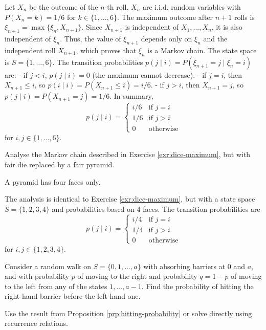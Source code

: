 \begin{Solution}
Let $X_n$ be the outcome of the $n$-th roll. $X_n$ are i.i.d. random variables with $P(X_n = k) = 1/6$ for $k \in \{1, \dots, 6\}$.
The maximum outcome after $n+1$ rolls is $\xi_{n+1} = \max\{\xi_n, X_{n+1}\}$. Since $X_{n+1}$ is independent of $X_1, \dots, X_n$, it is also independent of $\xi_n$. Thus, the value of $\xi_{n+1}$ depends only on $\xi_n$ and the independent roll $X_{n+1}$, which proves that $\xi_n$ is a Markov chain.
The state space is $S = \{1, \dots, 6\}$. The transition probabilities $p(j \mid i) = P(\xi_{n+1} = j \mid \xi_n = i)$ are:
- if $j < i$, $p(j \mid i) = 0$ (the maximum cannot decrease).
- if $j = i$, then $X_{n+1} \leq i$, so $p(i \mid i) = P(X_{n+1} \leq i) = i/6$.
- if $j > i$, then $X_{n+1} = j$, so $p(j \mid i) = P(X_{n+1} = j) = 1/6$.
In summary,
\[
p(j \mid i) = \begin{cases} i/6 & \text{if } j=i \\ 1/6 & \text{if } j > i \\ 0 & \text{otherwise} \end{cases}
\]
for $i, j \in \{1, \dots, 6\}$.
\end{Solution}

\begin{Exercise}
\label{exr:pyramid-maximum}
Analyse the Markov chain described in Exercise \ref{exr:dice-maximum}, but with fair die replaced by a fair pyramid.

\begin{hint}
A pyramid has four faces only.
\end{hint}
\end{Exercise}

\begin{Solution}
The analysis is identical to Exercise \ref{exr:dice-maximum}, but with a state space $S = \{1, 2, 3, 4\}$ and probabilities based on 4 faces. The transition probabilities are
\[
p(j \mid i) = \begin{cases} i/4 & \text{if } j=i \\ 1/4 & \text{if } j > i \\ 0 & \text{otherwise} \end{cases}
\]
for $i, j \in \{1, 2, 3, 4\}$.
\end{Solution}

\begin{Exercise}
\label{exr:random-walk-absorbing}
Consider a random walk on $S = \{0,1,\ldots,a\}$ with absorbing barriers at 0 and $a$, and with probability $p$ of moving to the right and probability $q = 1-p$ of moving to the left from any of the states $1,\ldots,a-1$. Find the probability of hitting the right-hand barrier before the left-hand one.

\begin{hint}
Use the result from Proposition \ref{prp:hitting-probability} or solve directly using recurrence relations.
\end{hint}
\end{Exercise}

